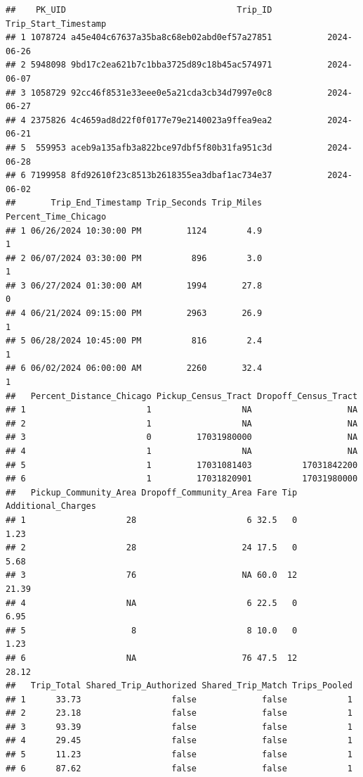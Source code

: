 \documentclass[
]{article}
\begin{document}
\begin{verbatim}
##    PK_UID                                  Trip_ID Trip_Start_Timestamp
## 1 1078724 a45e404c67637a35ba8c68eb02abd0ef57a27851           2024-06-26
## 2 5948098 9bd17c2ea621b7c1bba3725d89c18b45ac574971           2024-06-07
## 3 1058729 92cc46f8531e33eee0e5a21cda3cb34d7997e0c8           2024-06-27
## 4 2375826 4c4659ad8d22f0f0177e79e2140023a9ffea9ea2           2024-06-21
## 5  559953 aceb9a135afb3a822bce97dbf5f80b31fa951c3d           2024-06-28
## 6 7199958 8fd92610f23c8513b2618355ea3dbaf1ac734e37           2024-06-02
##       Trip_End_Timestamp Trip_Seconds Trip_Miles Percent_Time_Chicago
## 1 06/26/2024 10:30:00 PM         1124        4.9                    1
## 2 06/07/2024 03:30:00 PM          896        3.0                    1
## 3 06/27/2024 01:30:00 AM         1994       27.8                    0
## 4 06/21/2024 09:15:00 PM         2963       26.9                    1
## 5 06/28/2024 10:45:00 PM          816        2.4                    1
## 6 06/02/2024 06:00:00 AM         2260       32.4                    1
##   Percent_Distance_Chicago Pickup_Census_Tract Dropoff_Census_Tract
## 1                        1                  NA                   NA
## 2                        1                  NA                   NA
## 3                        0         17031980000                   NA
## 4                        1                  NA                   NA
## 5                        1         17031081403          17031842200
## 6                        1         17031820901          17031980000
##   Pickup_Community_Area Dropoff_Community_Area Fare Tip Additional_Charges
## 1                    28                      6 32.5   0               1.23
## 2                    28                     24 17.5   0               5.68
## 3                    76                     NA 60.0  12              21.39
## 4                    NA                      6 22.5   0               6.95
## 5                     8                      8 10.0   0               1.23
## 6                    NA                     76 47.5  12              28.12
##   Trip_Total Shared_Trip_Authorized Shared_Trip_Match Trips_Pooled
## 1      33.73                  false             false            1
## 2      23.18                  false             false            1
## 3      93.39                  false             false            1
## 4      29.45                  false             false            1
## 5      11.23                  false             false            1
## 6      87.62                  false             false            1

\end{verbatim}
\end{document}
